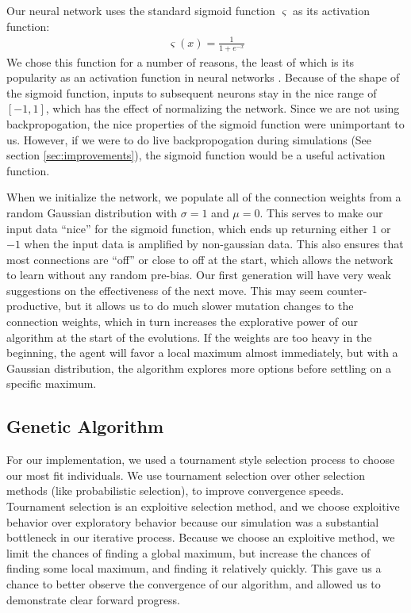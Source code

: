 \documentclass{article}
\begin{document}
Our neural network uses the standard sigmoid function $\varsigma$ as its
activation function:
\begin{align*}
  \varsigma(x) = \frac{1}{1 + e^{-x}}
\end{align*}
We chose this function for a number of reasons, the least of which is its
popularity as an activation function in neural networks \cite{russell}. Because
of the shape of the sigmoid function, inputs to subsequent neurons stay in the
nice range of $[-1, 1]$, which has the effect of normalizing the network. Since
we are not using backpropogation, the nice properties of the sigmoid function
were unimportant to us. However, if we were to do live backpropogation during
simulations (See section \ref{sec:improvements}), the sigmoid function would be
a useful activation function.

When we initialize the network, we populate all of the connection weights from a
random Gaussian distribution with $\sigma = 1$ and $\mu = 0$. This serves to
make our input data ``nice'' for the sigmoid function, which ends up returning
either $1$ or $-1$ when the input data is amplified by non-gaussian data. This
also ensures that most connections are ``off'' or close to off at the start,
which allows the network to learn without any random pre-bias. Our first
generation will have very weak suggestions on the effectiveness of the next
move. This may seem counter-productive, but it allows us to do much slower
mutation changes to the connection weights, which in turn increases the
explorative power of our algorithm at the start of the evolutions. If the
weights are too heavy in the beginning, the agent will favor a local maximum
almost immediately, but with a Gaussian distribution, the algorithm explores
more options before settling on a specific maximum.

\subsection{Genetic Algorithm}
For our implementation, we used a tournament style selection process to choose
our most fit individuals. We use tournament selection over other selection
methods (like probabilistic selection), to improve convergence speeds.
Tournament selection is an exploitive selection method, and we choose exploitive
behavior over exploratory behavior because our simulation was a substantial
bottleneck in our iterative process. Because we choose an exploitive method, we
limit the chances of finding a global maximum, but increase the chances of
finding some local maximum, and finding it relatively quickly. This gave us a
chance to better observe the convergence of our algorithm, and allowed us to
demonstrate clear forward progress.
\end{document}
